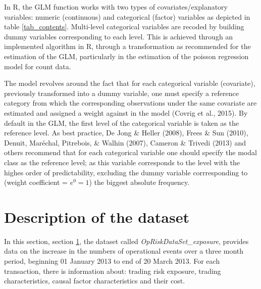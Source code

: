 \documentclass{DissertateUSU}
\begin{document}
In R, the GLM function works with two types of covariates/explanatory
variables: numeric (continuous) and categorical (factor) variables as
depicted in table \ref{tab_contents}. Multi-level categorical variables
are recoded by building dummy variables corresponding to each level.
This is achieved through an implemented algorithm in R, through a
transformation as recommended for the estimation of the GLM,
particularly in the estimation of the poisson regression model for count
data.\medskip

The model revolves around the fact that for each categorical variable
(covariate), previously transformed into a dummy variable, one must
specify a reference category from which the corresponding observations
under the same covariate are estimated and assigned a weight against in
the model (Covrig et al., 2015). By default in the GLM, the first level
of the categorical variable is taken as the reference level. As best
practice, De Jong \& Heller (2008), Frees \& Sun (2010), Denuit,
Maréchal, Pitrebois, \& Walhin (2007), Cameron \& Trivedi (2013) and
others recommend that for each categorical variable one should specify
the modal class as the reference level; as this variable corresponds to
the level with the highes order of predictability, excluding the dummy
variable corrresponding to (weight coefficient = \(e^0 = 1\)) the
biggest absolute frequency.

\section{Description of the dataset}
\label{sec:Description of the dataset}

In this section, section \ref{sec:Description of the dataset}, the
dataset called \emph{OpRiskDataSet\_exposure}, provides data on the
increase in the numbers of operational events over a three month period,
beginning 01 January 2013 to end of 20 March 2013. For each transaction,
there is information about: trading risk exposure, trading
characteristics, causal factor characteristics and their cost.
\end{document}
